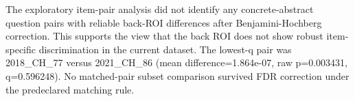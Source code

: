 The exploratory item-pair analysis did not identify any concrete-abstract question pairs with reliable back-ROI differences after Benjamini-Hochberg correction. This supports the view that the back ROI does not show robust item-specific discrimination in the current dataset. The lowest-q pair was 2018_CH_77 versus 2021_CH_86 (mean difference=1.864e-07, raw p=0.003431, q=0.596248). No matched-pair subset comparison survived FDR correction under the predeclared matching rule.
